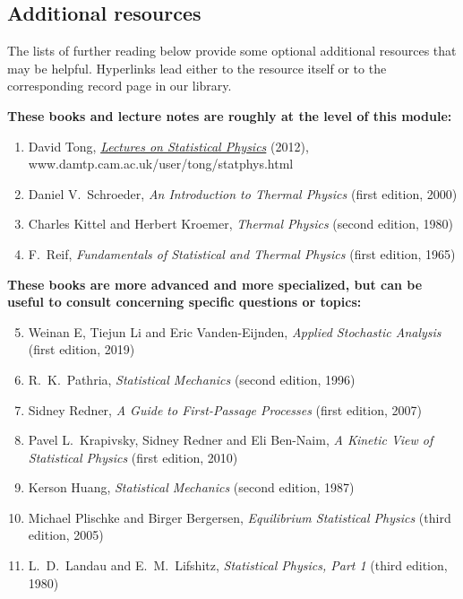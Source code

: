\documentclass[12 pt]{article}
\begin{document}
{%
\subsection*{Additional resources}
The lists of further reading below provide some optional additional resources that may be helpful.
Hyperlinks lead either to the resource itself or to the corresponding record page in our library.

\noindent\textbf{These books and lecture notes are roughly at the level of this module:} \\[-24 pt]
\begin{enumerate}
  \item David Tong, \href{https://www.damtp.cam.ac.uk/user/tong/statphys.html}{\textit{Lectures on Statistical Physics}} (2012), \\ www.damtp.cam.ac.uk/user/tong/statphys.html
  \item Daniel V.~Schroeder, \textit{An Introduction to Thermal Physics} (first edition, 2000)
  \item Charles Kittel and Herbert Kroemer, \textit{Thermal Physics} (second edition, 1980)
  \item F.~Reif, \textit{Fundamentals of Statistical and Thermal Physics} (first edition, 1965)
\end{enumerate}

\noindent\textbf{These books are more advanced and more specialized, but can be useful to consult concerning specific questions or topics:} \\[-24 pt]
\begin{enumerate}
  \setcounter{enumi}{4}
  \item Weinan E, Tiejun Li and Eric Vanden-Eijnden, \textit{Applied Stochastic Analysis} (first edition, 2019)
  \item R.~K.~Pathria, \textit{Statistical Mechanics} (second edition, 1996)
  \item Sidney Redner, \textit{A Guide to First-Passage Processes} (first edition, 2007)
  \item Pavel L.~Krapivsky, Sidney Redner and Eli Ben-Naim, \textit{A Kinetic View of Statistical Physics} (first edition, 2010)
  \item Kerson Huang, \textit{Statistical Mechanics} (second edition, 1987)
  \item Michael Plischke and Birger Bergersen, \textit{Equilibrium Statistical Physics} (third edition, 2005)
  \item L.~D.~Landau and E.~M.~Lifshitz, \textit{Statistical Physics, Part 1} (third edition, 1980)
\end{enumerate}

}
\end{document}
